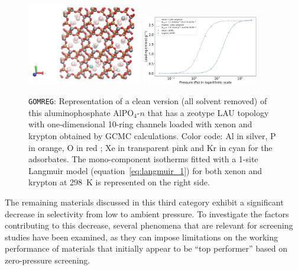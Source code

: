 \documentclass[main.tex]{subfiles}
\begin{document}
\begin{figure}[ht]
  \centering
    \includegraphics[width=0.45\textwidth]{figures/2-thermo/GOMREG_clean.jpg}
    \includegraphics[width=0.45\textwidth]{figures/2-thermo/GOMREG_clean_isotherm_xenon_krypton_298K.jpg}
    \caption{\texttt{GOMREG}: Representation of a clean version (all solvent removed) of this aluminophosphate AlPO$_4$-$n$ that has a zeotype LAU topology with one-dimensional 10-ring channels loaded with xenon and krypton obtained by GCMC calculations. Color code: Al in silver, P in orange, O in red ; Xe in transparent pink and Kr in cyan for the adsorbates. The mono-component isotherms fitted with a 1-site Langmuir model (equation~\ref{eq:langmuir_1}) for both xenon and krypton at \SI{298}{\kelvin} is represented on the right side.}\label{fgr:SI:examples:GOMREG}
  \end{figure}

The remaining materials discussed in this third category exhibit a significant decrease in selectivity from low to ambient pressure. To investigate the factors contributing to this decrease, several phenomena that are relevant for screening studies have been examined, as they can impose limitations on the working performance of materials that initially appear to be ``top performer'' based on zero-pressure screening.
\end{document}
